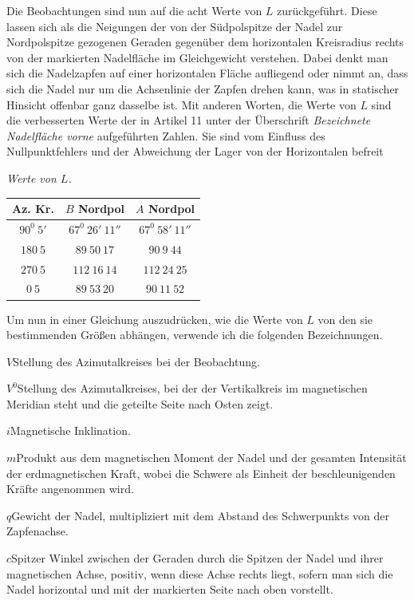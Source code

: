 Die Beobachtungen sind nun auf die acht Werte von $L$ zurückgeführt. Diese lassen sich als die Neigungen der von der Südpolspitze der Nadel zur Nordpolspitze gezogenen Geraden gegenüber dem horizontalen Kreisradius rechts von der markierten Nadelfläche im Gleichgewicht verstehen. Dabei denkt man sich die Nadelzapfen auf einer horizontalen Fläche aufliegend oder nimmt an, dass sich die Nadel nur um die Achsenlinie der Zapfen drehen kann, was in statischer Hinsicht offenbar ganz dasselbe ist. Mit anderen Worten, die Werte von $L$ sind die verbesserten Werte der in Artikel 11 unter der Überschrift \textit{Bezeichnete Nadelfläche vorne} aufgeführten Zahlen. Sie sind vom Einfluss des Nullpunktfehlers und der Abweichung der Lager von der Horizontalen befreit
\begin{center}
\textit{Werte von $L$.}\par\smallskip
\begin{tabular}{c|c|c}
Az. Kr.&$B$ Nordpol&$A$ Nordpol\\\hline
$90^0\ 5'$&$67^0\ 26'\ 11''$&$67^0\ 58'\ 11''$\\
$180\ 5$&$89\ 50\ 17$&$90\ 9\ 44$\\
$270\ 5$&$112\ 16\ 14$&$112\ 24\ 25$\\
$0\ 5$&$89\ 53\ 20$&$90\ 11\ 52$
\end{tabular}
\end{center}

Um nun in einer Gleichung auszudrücken, wie die Werte von $L$ von den sie bestimmenden Größen abhängen, verwende ich die folgenden Bezeichnungen.

$V$\quad Stellung des Azimutalkreises bei der Beobachtung.

$V^0$\quad Stellung des Azimutalkreises, bei der der Vertikalkreis im magnetischen Meridian steht und die geteilte Seite nach Osten zeigt.

$i$\quad Magnetische Inklination.


$m$\quad Produkt aus dem magnetischen Moment der Nadel und der gesamten Intensität der erdmagnetischen Kraft, wobei die Schwere als Einheit der beschleunigenden Kräfte angenommen wird.

$q$\quad Gewicht der Nadel, multipliziert mit dem Abstand des Schwerpunkts von der Zapfenachse.

$c$\quad Spitzer Winkel zwischen der Geraden durch die Spitzen der Nadel und ihrer magnetischen Achse, positiv, wenn diese Achse rechts liegt, sofern man sich die Nadel horizontal und mit der markierten Seite nach oben vorstellt.


